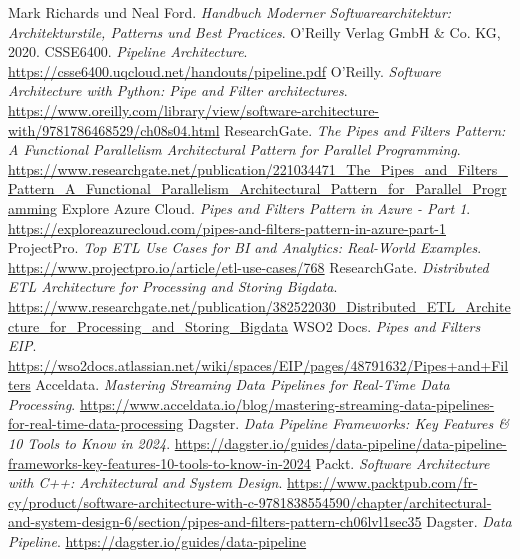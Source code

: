 \documentclass[10pt]{article}
\begin{document}
\begin{thebibliography}{99}
 Mark Richards und Neal Ford. \textit{Handbuch Moderner Softwarearchitektur: Architekturstile, Patterns und Best Practices}. O'Reilly Verlag GmbH \& Co. KG, 2020.
 CSSE6400. \textit{Pipeline Architecture}. \url{https://csse6400.uqcloud.net/handouts/pipeline.pdf}
 O'Reilly. \textit{Software Architecture with Python: Pipe and Filter architectures}. \url{https://www.oreilly.com/library/view/software-architecture-with/9781786468529/ch08s04.html}
 ResearchGate. \textit{The Pipes and Filters Pattern: A Functional Parallelism Architectural Pattern for Parallel Programming}. \url{https://www.researchgate.net/publication/221034471_The_Pipes_and_Filters_Pattern_A_Functional_Parallelism_Architectural_Pattern_for_Parallel_Programming}
 Explore Azure Cloud. \textit{Pipes and Filters Pattern in Azure - Part 1}. \url{https://exploreazurecloud.com/pipes-and-filters-pattern-in-azure-part-1}
 ProjectPro. \textit{Top ETL Use Cases for BI and Analytics: Real-World Examples}. \url{https://www.projectpro.io/article/etl-use-cases/768}
 ResearchGate. \textit{Distributed ETL Architecture for Processing and Storing Bigdata}. \url{https://www.researchgate.net/publication/382522030_Distributed_ETL_Architecture_for_Processing_and_Storing_Bigdata}
 WSO2 Docs. \textit{Pipes and Filters EIP}. \url{https://wso2docs.atlassian.net/wiki/spaces/EIP/pages/48791632/Pipes+and+Filters}
 Acceldata. \textit{Mastering Streaming Data Pipelines for Real-Time Data Processing}. \url{https://www.acceldata.io/blog/mastering-streaming-data-pipelines-for-real-time-data-processing}
 Dagster. \textit{Data Pipeline Frameworks: Key Features \& 10 Tools to Know in 2024}. \url{https://dagster.io/guides/data-pipeline/data-pipeline-frameworks-key-features-10-tools-to-know-in-2024}
 Packt. \textit{Software Architecture with C++: Architectural and System Design}. \url{https://www.packtpub.com/fr-cy/product/software-architecture-with-c-9781838554590/chapter/architectural-and-system-design-6/section/pipes-and-filters-pattern-ch06lvl1sec35}
 Dagster. \textit{Data Pipeline}. \url{https://dagster.io/guides/data-pipeline}
\end{thebibliography}
\end{document}
